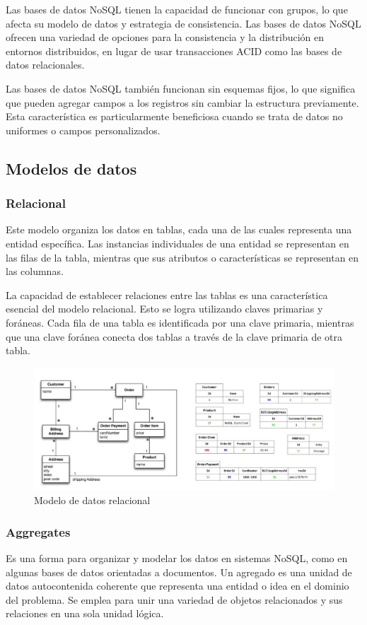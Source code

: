 \documentclass{article}
\begin{document}
		Las bases de datos NoSQL tienen la capacidad de funcionar con grupos, lo que afecta su modelo de datos y estrategia de consistencia. Las bases de datos NoSQL ofrecen una variedad de opciones para la consistencia y la distribución en entornos distribuidos, en lugar de usar transacciones ACID como las bases de datos relacionales.
		
		Las bases de datos NoSQL también funcionan sin esquemas fijos, lo que significa que pueden agregar campos a los registros sin cambiar la estructura previamente. Esta característica es particularmente beneficiosa cuando se trata de datos no uniformes o campos personalizados.
		
		\subsection{Modelos de datos}
		\subsubsection{Relacional}
		Este modelo organiza los datos en tablas, cada una de las cuales representa una entidad específica. Las instancias individuales de una entidad se representan en las filas de la tabla, mientras que sus atributos o características se representan en las columnas.
		
		La capacidad de establecer relaciones entre las tablas es una característica esencial del modelo relacional. Esto se logra utilizando claves primarias y foráneas. Cada fila de una tabla es identificada por una clave primaria, mientras que una clave foránea conecta dos tablas a través de la clave primaria de otra tabla.
			\begin{figure}[h]
			\centering
			\includegraphics[width=1\textwidth]{dato_relacional.png}
			\caption{Modelo de datos relacional}
		\end{figure}
		
		
		\subsubsection{Aggregates}
		Es una forma para organizar y modelar los datos en sistemas NoSQL, como en algunas bases de datos orientadas a documentos. Un agregado es una unidad de datos autocontenida coherente que representa una entidad o idea en el dominio del problema. Se emplea para unir una variedad de objetos relacionados y sus relaciones en una sola unidad lógica.
		
\end{document}
